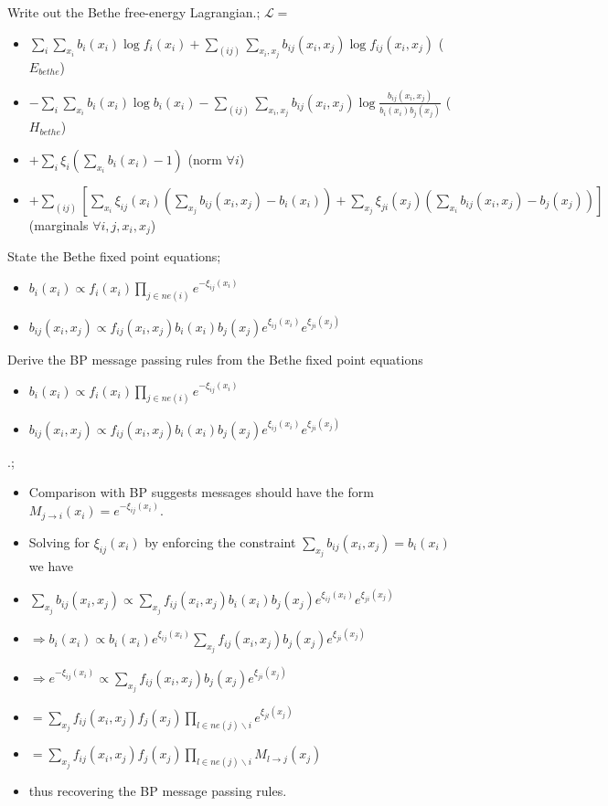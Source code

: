 \documentclass{article}
\begin{document}
Write out the Bethe free-energy Lagrangian.; $\mathcal{L} =$\begin{itemize}
    \item $\sum_i \sum_{x_i} b_i(x_i)\log f_i(x_i) + \sum_{(ij)}\sum_{x_i, x_j} b_{ij}(x_i, x_j)\log f_{ij}(x_i, x_j)$ ($E_{bethe}$)
    \item $-\sum_i \sum_{x_i}b_i(x_i)\log b_i(x_i) - \sum_{(ij)}\sum_{x_i, x_j}b_{ij}(x_i, x_j)\log \frac{b_{ij}(x_i, x_j)}{b_i(x_i)b_j(x_j)}$ ($H_{bethe}$)
    \item $+\sum_i \xi_i (\sum_{x_i}b_i(x_i) - 1)$ (norm $\forall i$)
    \item $+ \sum_{(ij)}[\sum_{x_i}\xi_{ij}(x_i)(\sum_{x_j}b_{ij}(x_i, x_j) - b_i(x_i)) + \sum_{x_j}\xi_{ji}(x_j)(\sum_{x_i}b_{ij}(x_i, x_j) - b_j(x_j))]$ (marginals $\forall i, j, x_i, x_j$)
\end{itemize}

State the Bethe fixed point equations; \begin{itemize}
    \item $b_i(x_i) \propto f_i(x_i)\prod_{j\in ne(i)} e^{-\xi_{ij}(x_i)}$
    \item $b_{ij}(x_i, x_j) \propto f_{ij}(x_i, x_j)b_i(x_i)b_j(x_j)e^{\xi_{ij}(x_i)}e^{\xi_{ji}(x_j)}$
\end{itemize}

Derive the BP message passing rules from the Bethe fixed point equations \begin{itemize}
    \item $b_i(x_i) \propto f_i(x_i)\prod_{j\in ne(i)} e^{-\xi_{ij}(x_i)}$
    \item $b_{ij}(x_i, x_j) \propto f_{ij}(x_i, x_j)b_i(x_i)b_j(x_j)e^{\xi_{ij}(x_i)}e^{\xi_{ji}(x_j)}$
\end{itemize}.; \begin{itemize}
    \item Comparison with BP suggests messages should have the form $M_{j\rightarrow i}(x_i) = e^{-\xi_{ij}(x_i)}$.
    \item Solving for $\xi_{ij}(x_i)$ by enforcing the constraint $\sum_{x_j} b_{ij}(x_i, x_j) = b_i(x_i)$ we have
    \item $\sum_{x_j} b_{ij}(x_i, x_j) \propto \sum_{x_j} f_{ij}(x_i, x_j)b_i(x_i)b_j(x_j)e^{\xi_{ij}(x_i)}e^{\xi_{ji}(x_j)}$
    \item $\Rightarrow b_i(x_i) \propto b_i(x_i)e^{\xi_{ij}(x_i)}\sum_{x_j} f_{ij}(x_i, x_j)b_j(x_j)e^{\xi_{ji}(x_j)}$
    \item $\Rightarrow e^{-\xi_{ij}(x_i)} \propto \sum_{x_j} f_{ij}(x_i, x_j)b_j(x_j)e^{\xi_{ji}(x_j)}$
    \item $=\sum_{x_j} f_{ij}(x_i, x_j)f_j(x_j)\prod_{l\in ne(j)\backslash i}e^{\xi_{jl}(x_j)}$
    \item $=\sum_{x_j} f_{ij}(x_i, x_j)f_j(x_j)\prod_{l\in ne(j)\backslash i}M_{l\rightarrow j}(x_j)$
    \item thus recovering the BP message passing rules.
\end{itemize}
\end{document}
